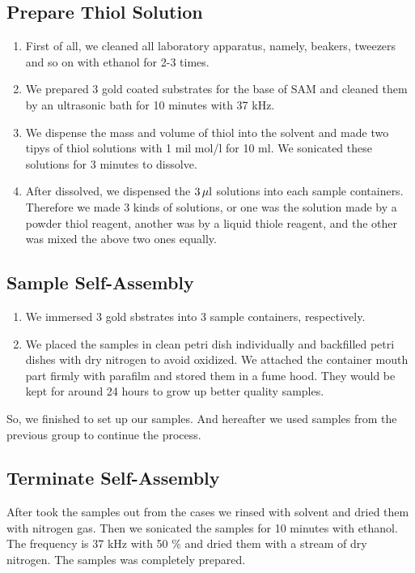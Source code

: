 \subsection{Prepare Thiol Solution}
\begin{enumerate}
 \item First of all, we cleaned all laboratory apparatus, namely, beakers, tweezers and so on with ethanol for 2-3 times.


 \item We prepared 3 gold coated substrates for the base of SAM and cleaned them by an ultrasonic bath for 10 minutes with 37 kHz.
 \item We dispense the mass and volume of thiol into the solvent and made two tipys of thiol solutions with 1 mil mol/l for 10 ml. We sonicated these solutions for 3 minutes to dissolve.
 \item After dissolved, we dispensed the $3 \, \mu \rm l$ solutions into each sample containers. Therefore we made 3 kinds of solutions, or one was the solution made by a powder thiol reagent, another was by a liquid thiole reagent, and the other was mixed the above two ones equally. 
\end{enumerate}
\subsection{Sample Self-Assembly}
\begin{enumerate}
 \item We immersed 3 gold sbstrates into 3 sample containers, respectively.  
 \item We placed the samples in clean petri dish individually and backfilled petri dishes with dry nitrogen to avoid oxidized. We attached the container mouth part firmly with parafilm and stored them in a fume hood. They would be kept for around 24 hours to grow up better quality samples.
\end{enumerate}
So, we finished to set up our samples. And hereafter we used samples from the previous group to continue the process.


\subsection{Terminate Self-Assembly}
After took the samples out from the cases we rinsed with solvent and dried them with nitrogen gas. Then we sonicated the samples for 10 minutes with ethanol. The frequency is 37 kHz with 50 \% and dried them with a stream of dry nitrogen. The samples was completely prepared.


